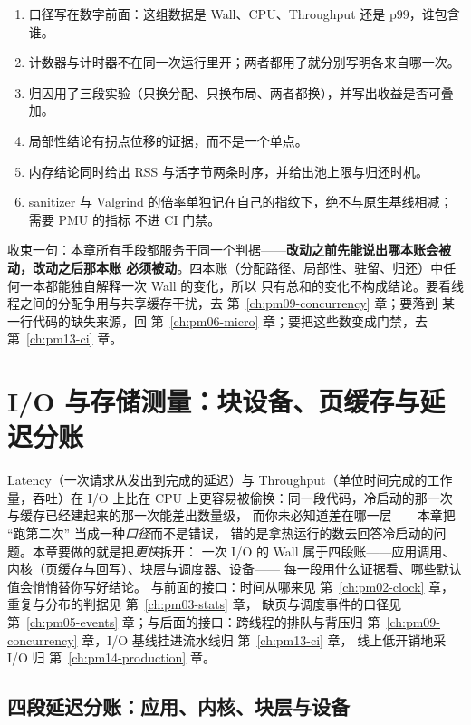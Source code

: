 \documentclass[12pt,a4paper,fontset=fandol]{ctexbook}
\newcommand{\Lang}[1]{\textsf{#1}}
\newcommand{\MWall}{\Lang{Wall}}
\newcommand{\MCpu}{\Lang{CPU}}
\newcommand{\MLat}{\Lang{Latency}}
\newcommand{\MThr}{\Lang{Throughput}}
\newcommand{\Mx}[1]{\textsf{#1}}
\begin{document}
\begin{bestpractice}[title={内存侧改动上线前的六条自检}]
  \begin{enumerate}
    \item 口径写在数字前面：这组数据是 \MWall{}、\MCpu{}、\MThr{} 还是 \Mx{p99}，谁包含谁。
    \item 计数器与计时器不在同一次运行里开；两者都用了就分别写明各来自哪一次。
    \item 归因用了三段实验（只换分配、只换布局、两者都换），并写出收益是否可叠加。
    \item 局部性结论有拐点位移的证据，而不是一个单点。
    \item 内存结论同时给出 \Mx{RSS} 与活字节两条时序，并给出池上限与归还时机。
    \item sanitizer 与 Valgrind 的倍率单独记在自己的指纹下，绝不与原生基线相减；需要 PMU 的指标
          不进 CI 门禁。
  \end{enumerate}
\end{bestpractice}

收束一句：本章所有手段都服务于同一个判据——\textbf{改动之前先能说出哪本账会被动，改动之后那本账
必须被动}。四本账（分配路径、局部性、驻留、归还）中任何一本都能独自解释一次 \MWall{} 的变化，所以
只有总和的变化不构成结论。要看线程之间的分配争用与共享缓存干扰，去 第~\ref{ch:pm09-concurrency} 章；要落到
某一行代码的缺失来源，回 第~\ref{ch:pm06-micro} 章；要把这些数变成门禁，去 第~\ref{ch:pm13-ci} 章。

\chapter{I/O 与存储测量：块设备、页缓存与延迟分账}
\label{ch:pm08-io}

\MLat{}（一次请求从发出到完成的延迟）与 \MThr{}（单位时间完成的工作量，吞吐）在 I/O 上比在
CPU 上更容易被偷换：同一段代码，冷启动的那一次与缓存已经建起来的那一次能差出数量级，
而你未必知道差在哪一层——本章把 ``跑第二次'' 当成一种\emph{口径}而不是错误，
错的是拿热运行的数去回答冷启动的问题。本章要做的就是把\emph{更快}拆开：
一次 I/O 的 \MWall{} 属于四段账——应用调用、内核（页缓存与回写）、块层与调度器、设备——
每一段用什么证据看、哪些默认值会悄悄替你写好结论。
与前面的接口：时间从哪来见 第~\ref{ch:pm02-clock} 章，重复与分布的判据见 第~\ref{ch:pm03-stats} 章，
缺页与调度事件的口径见 第~\ref{ch:pm05-events} 章；与后面的接口：跨线程的排队与背压归
第~\ref{ch:pm09-concurrency} 章，I/O 基线挂进流水线归 第~\ref{ch:pm13-ci} 章，
线上低开销地采 I/O 归 第~\ref{ch:pm14-production} 章。

\section{四段延迟分账：应用、内核、块层与设备}
\label{sec:pm08-ledger}
\end{document}
